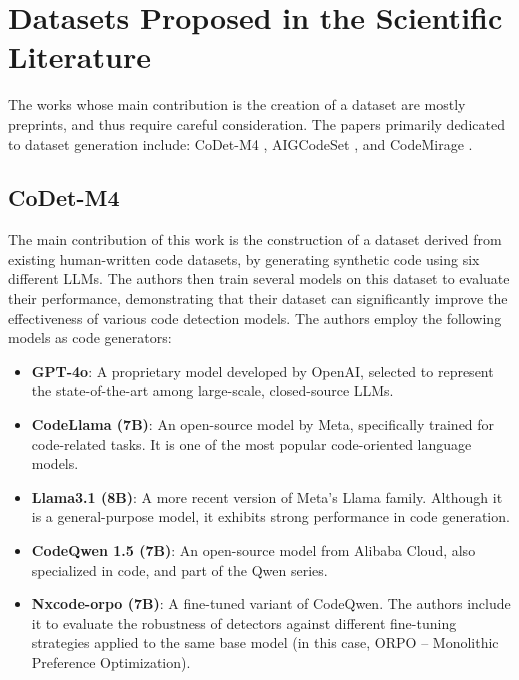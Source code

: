 \clearpage
\section{Datasets Proposed in the Scientific Literature}
The works whose main contribution is the 
creation of a dataset are mostly preprints, 
and thus require careful consideration. 
The papers primarily dedicated to dataset 
generation include: CoDet-M4 \cite{orel2025codet}, 
AIGCodeSet \cite{demirok2024aigcodeset}, 
and CodeMirage \cite{guo2025codemirage}.

\subsection*{CoDet-M4}
The main contribution of this work is the construction 
of a dataset derived from existing human-written code datasets, 
by generating synthetic code using six different LLMs. 
The authors then train several models on this dataset 
to evaluate their performance, 
demonstrating that their dataset can significantly improve 
the effectiveness of various code detection models.
The authors employ the following models as code generators:

\begin{itemize}
    \item \textbf{GPT-4o}: A proprietary model developed by OpenAI, selected to represent the state-of-the-art among large-scale, closed-source LLMs.
    
    \item \textbf{CodeLlama (7B)}: An open-source model by Meta, specifically trained for code-related tasks. It is one of the most popular code-oriented language models.
    
    \item \textbf{Llama3.1 (8B)}: A more recent version of Meta’s Llama family. Although it is a general-purpose model, it exhibits strong performance in code generation.
    
    \item \textbf{CodeQwen 1.5 (7B)}: An open-source model from Alibaba Cloud, also specialized in code, and part of the Qwen series.
    
    \item \textbf{Nxcode-orpo (7B)}: A fine-tuned variant of CodeQwen. The authors include it to evaluate the robustness of detectors against different fine-tuning strategies applied to the same base model (in this case, ORPO – Monolithic Preference Optimization).
\end{itemize}


